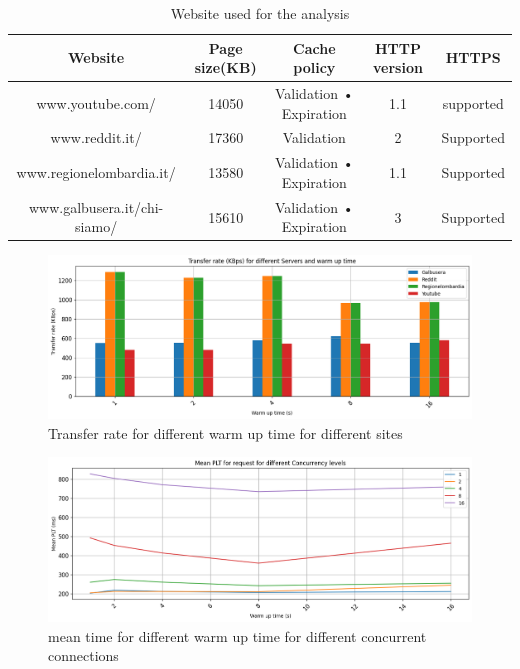 \documentclass[eng]{class}
\begin{document}
\begin{table}[H]
	\tiny
	\centering
	\begin{tabular}{|c|c|c|c|c|}
		\hline
		\linewidth=0cm
		Website                     & Page size(KB) & Cache policy            & HTTP version & HTTPS     \\
		\hline
		www.youtube.com/            & 14050         & Validation • Expiration & 1.1          & supported \\
		www.reddit.it/              & 17360         & Validation              & 2            & Supported \\
		www.regionelombardia.it/    & 13580         & Validation • Expiration & 1.1          & Supported \\
		www.galbusera.it/chi-siamo/ & 15610         & Validation • Expiration & 3            & Supported \\
		\hline
	\end{tabular}
	\caption{Website used for the analysis}
	\label{tab-4}
\end{table}

\begin{figure}[H]
	\centering
	\includegraphics[width=\columnwidth]{images/transf_rate_diff_warm_up.png}
	\caption{Transfer rate for different warm up time for different sites}
	\label{fig-6}
\end{figure}

\begin{figure}[H]
	\centering
	\includegraphics[width=\columnwidth]{images/mean_time_warm_up.png}
	\caption{mean time for different warm up time for different concurrent connections}
	\label{fig-7}
\end{figure}
\end{document}
